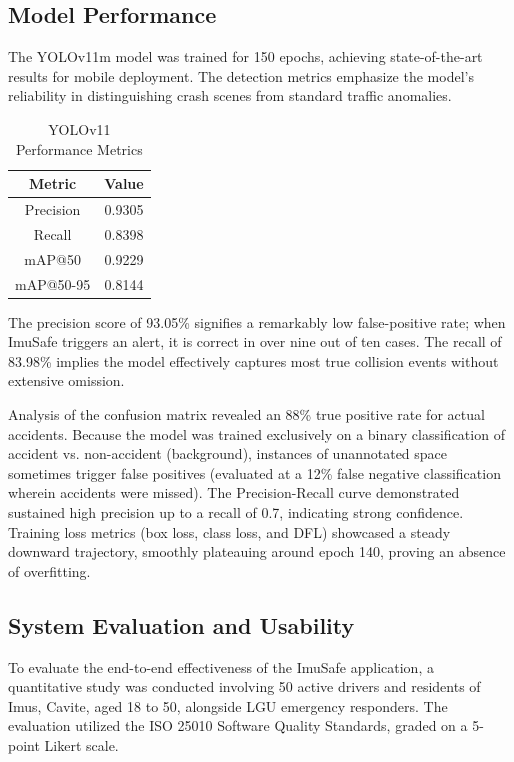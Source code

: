 \documentclass[conference]{IEEEtran}
\begin{document}
\subsection{Model Performance}
The YOLOv11m model was trained for 150 epochs, achieving state-of-the-art results for mobile deployment. The detection metrics emphasize the model's reliability in distinguishing crash scenes from standard traffic anomalies. 

\begin{table}[htbp]
\caption{YOLOv11 Performance Metrics}
\begin{center}
\begin{tabular}{|c|c|}
\hline
\textbf{Metric} & \textbf{Value} \\
\hline
Precision & 0.9305 \\
\hline
Recall & 0.8398 \\
\hline
mAP@50 & 0.9229 \\
\hline
mAP@50-95 & 0.8144 \\
\hline
\end{tabular}
\label{tab:metrics}
\end{center}
\end{table}

The precision score of 93.05\% signifies a remarkably low false-positive rate; when ImuSafe triggers an alert, it is correct in over nine out of ten cases. The recall of 83.98\% implies the model effectively captures most true collision events without extensive omission. 

Analysis of the confusion matrix revealed an 88\% true positive rate for actual accidents. Because the model was trained exclusively on a binary classification of accident vs. non-accident (background), instances of unannotated space sometimes trigger false positives (evaluated at a 12\% false negative classification wherein accidents were missed). The Precision-Recall curve demonstrated sustained high precision up to a recall of 0.7, indicating strong confidence. Training loss metrics (box loss, class loss, and DFL) showcased a steady downward trajectory, smoothly plateauing around epoch 140, proving an absence of overfitting.

\subsection{System Evaluation and Usability}
To evaluate the end-to-end effectiveness of the ImuSafe application, a quantitative study was conducted involving 50 active drivers and residents of Imus, Cavite, aged 18 to 50, alongside LGU emergency responders. The evaluation utilized the ISO 25010 Software Quality Standards, graded on a 5-point Likert scale.
\end{document}
